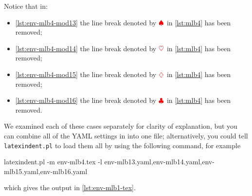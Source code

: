	\begin{minipage}{.45\linewidth}
	\end{minipage}
	\hfill
	\begin{minipage}{.45\linewidth}
	\end{minipage}

	\begin{minipage}{.45\linewidth}
	\end{minipage}
	\hfill
	\begin{minipage}{.45\linewidth}
	\end{minipage}

	Notice that in:
	\begin{itemize}
		\item \cref{lst:env-mlb4-mod13} the line break denoted by $\color{red}\spadesuit$ in
		      \cref{lst:mlb4} has been removed;
		\item \cref{lst:env-mlb4-mod14} the line break denoted by $\color{red}\heartsuit$ in
		      \cref{lst:mlb4} has been removed;
		\item \cref{lst:env-mlb4-mod15} the line break denoted by $\color{red}\diamondsuit$ in
		      \cref{lst:mlb4} has been removed;
		\item \cref{lst:env-mlb4-mod16} the line break denoted by $\color{red}\clubsuit$ in
		      \cref{lst:mlb4} has been removed.
	\end{itemize}
	We examined each of these cases separately for clarity of explanation, but you can
	combine all of the YAML settings in  into one file;
	alternatively, you could tell \texttt{latexindent.pl} to load them all by using the
	following command, for example
	\begin{widepage}
		\begin{commandshell}
latexindent.pl -m env-mlb4.tex -l env-mlb13.yaml,env-mlb14.yaml,env-mlb15.yaml,env-mlb16.yaml
\end{commandshell}
	\end{widepage}
	which gives the output in \vref{lst:env-mlb1-tex}.

